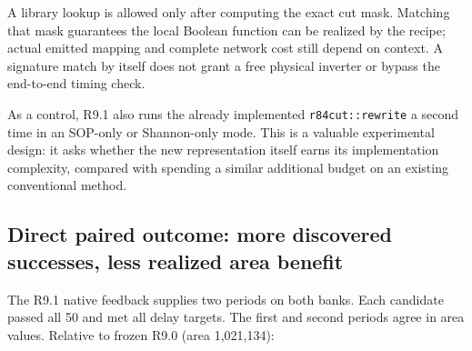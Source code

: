 A library lookup is allowed only after computing the exact cut mask. Matching that mask guarantees the local Boolean function can be realized by the recipe; actual emitted mapping and complete network cost still depend on context. A signature match by itself does not grant a free physical inverter or bypass the end-to-end timing check.

As a control, R9.1 also runs the already implemented \texttt{r84cut::rewrite} a second time in an SOP-only or Shannon-only mode. This is a valuable experimental design: it asks whether the new representation itself earns its implementation complexity, compared with spending a similar additional budget on an existing conventional method.

\subsection{Direct paired outcome: more discovered successes, less realized area benefit}\label{direct-paired-outcome-more-discovered-successes-less-realized-area-benefit}

The R9.1 native feedback supplies two periods on both banks. Each candidate passed all 50 and met all delay targets. The first and second periods agree in area values. Relative to frozen R9.0 (area 1,021,134):


